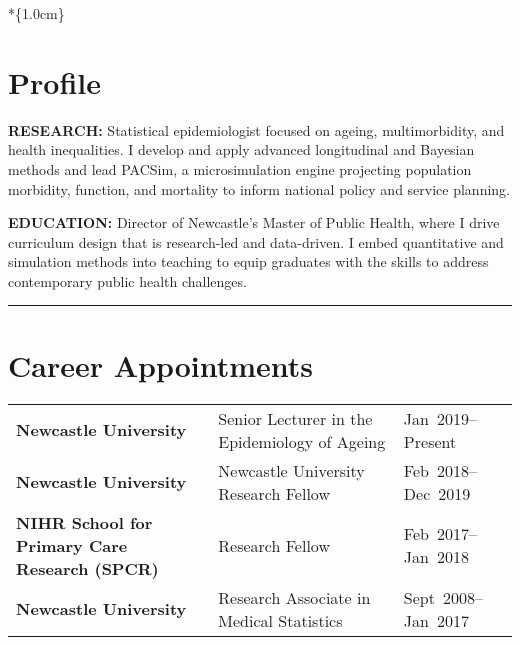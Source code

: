 \documentclass[
]{article}
\author{}
\date{}
\newcommand{\onedate}[1]{\mbox{#1}}
\begin{document}

\vspace

*\{1.0cm\}

\section{\texorpdfstring{\textcolor{banner}{Profile}}{}}\label{section}

\textcolor{accenttwo}{\textbf{RESEARCH:}} Statistical epidemiologist
focused on ageing, multimorbidity, and health inequalities. I develop
and apply advanced longitudinal and Bayesian methods and lead PACSim, a
microsimulation engine projecting population morbidity, function, and
mortality to inform national policy and service planning.

\textcolor{accenttwo}{\textbf{EDUCATION:}} Director of Newcastle's
Master of Public Health, where I drive curriculum design that is
research-led and data-driven. I embed quantitative and simulation
methods into teaching to equip graduates with the skills to address
contemporary public health challenges.

\begin{center}\rule{0.5\linewidth}{0.5pt}\end{center}

\section{\texorpdfstring{\textcolor{banner}{Career Appointments}}{}}\label{section-1}

\setlength{\tabcolsep}{0pt}
\begin{tabular}{@{}L{.30\textwidth} L{.52\textwidth} R{.18\textwidth}@{}}
\textbf{Newcastle University} & \textcolor{accenttwo}{Senior Lecturer in the Epidemiology of Ageing} & \onedate{Jan 2019--Present} \\
\textbf{Newcastle University} & \textcolor{accenttwo}{Newcastle University Research Fellow}          & \onedate{Feb 2018--Dec 2019} \\
\textbf{NIHR School for Primary Care Research (SPCR)} & \textcolor{accenttwo}{Research Fellow}     & \onedate{Feb 2017--Jan 2018} \\
\textbf{Newcastle University} & \textcolor{accenttwo}{Research Associate in Medical Statistics}       & \onedate{Sept 2008--Jan 2017} \\
\end{tabular}
\end{document}
